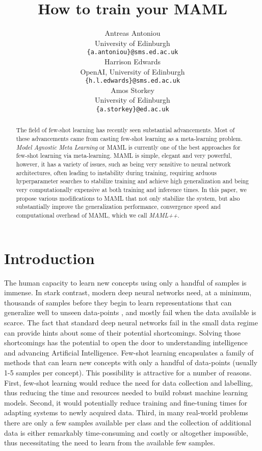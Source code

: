 \documentclass{article} \usepackage[dvipsnames]{xcolor}
\title{How to train your MAML}
\author{Antreas Antoniou \\
University of Edinburgh\\
\texttt{\{a.antoniou\}@sms.ed.ac.uk} \\
\And
Harrison Edwards\\
OpenAI,
University of Edinburgh\\
\texttt{\{h.l.edwards\}@sms.ed.ac.uk} \\
\AND
Amos Storkey \\
University of Edinburgh\\
\texttt{\{a.storkey\}@ed.ac.uk}}
\newcommand{\newmaml}{MAML++}
\begin{document}
\maketitle

\begin{abstract}
The field of few-shot learning has recently seen substantial advancements. Most of these advancements came from casting few-shot learning as a meta-learning problem. \emph{Model Agnostic Meta Learning} or MAML is currently one of the best approaches for few-shot learning via meta-learning. MAML is simple, elegant and very powerful, however, it has a variety of issues, such as being very sensitive to neural network architectures, often leading to instability during training, requiring arduous hyperparameter searches to stabilize training and achieve high generalization and being very computationally expensive at both training and inference times. In this paper, we propose various modifications to MAML that not only stabilize the system, but also substantially improve the generalization performance, convergence speed and computational overhead of MAML, which we call \emph{\newmaml}.
















\end{abstract}


\section{Introduction}
The human capacity to learn new concepts using only a handful of samples is immense. In stark contrast, modern deep neural networks need, at a minimum, thousands of samples before they begin to learn representations that can generalize well to unseen data-points \citep{krizhevsky2012imagenet,huang2017densely}, and mostly fail when the data available is scarce. The fact that standard deep neural networks fail in the small data regime can provide hints about some of their potential shortcomings. Solving those shortcomings has the potential to open the door to understanding intelligence and advancing Artificial Intelligence. Few-shot learning encapsulates a family of methods that can learn new concepts with only a handful of data-points (usually 1-5 samples per concept). This possibility is attractive for a number of reasons. First, few-shot learning would reduce the need for data collection and labelling, thus reducing the time and resources needed to build robust machine learning models. Second, it would potentially reduce training and fine-tuning times for adapting systems to newly acquired data. Third, in many real-world problems there are only a few samples available per class and the collection of additional data is either remarkably time-consuming and costly or altogether impossible, thus necessitating the need to learn from the available few samples. 
\end{document}
